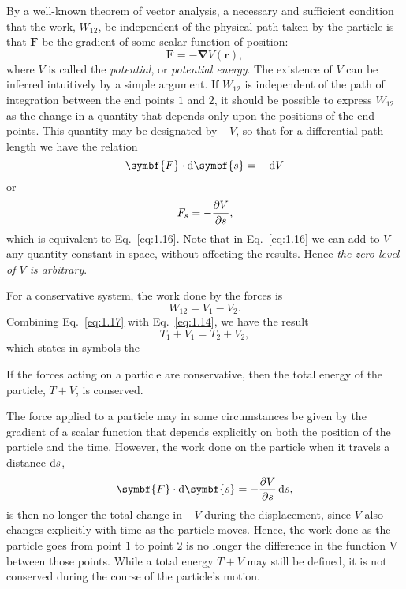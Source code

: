 By a well-known theorem of vector analysis, a necessary and sufficient condition that the work, \(W_{12}\), be independent of the physical path taken by the particle is that \(\symbf{F}\) be the gradient of some scalar function of position:
\begin{equation}
    \symbf{F}=-\symbf{\nabla} V\left(\symbf{r}\right),\label{eq:1.16}
\end{equation}
where \(V\) is called the \emph{potential}, or \emph{potential energy}. The existence of \(V\) can be inferred intuitively by a simple argument. If \(W_{12}\) is independent of the path of integration between the end points \(1\) and \(2\), it should be possible to express \(W_{12}\) as the change in a quantity that depends only upon the positions of the end points. This quantity may be designated by \(-V\), so that for a differential path length we have the relation
\begin{equation*}
    \symbf{F}\cdot\odif{\symbf{s}}=-\odif{V}
\end{equation*}
or
\begin{equation*}
    F_s=-\pdv{V}{s},
\end{equation*}
which is equivalent to Eq.~\eqref{eq:1.16}. Note that in Eq.~\eqref{eq:1.16} we can add to \(V\) any quantity constant in space, without affecting the results. Hence \emph{the zero level of \(V\) is arbitrary}.

For a conservative system, the work done by the forces is
\begin{equation}
    W_{12}=V_1-V_2.\label{eq:1.17}
\end{equation}
Combining Eq.~\eqref{eq:1.17} with Eq.~\eqref{eq:1.14}, we have the result
\begin{equation}
    T_1+V_1=T_2+V_2,\label{eq:1.18}
\end{equation}
which states in symbols the
\begin{theorem}
    If the forces acting on a particle are conservative, then the total energy of the particle, \(T+V\), is conserved.
\end{theorem}

The force applied to a particle may in some circumstances be given by the gradient of a scalar function that depends explicitly on both the position of the particle and the time. However, the work done on the particle when it travels a distance \(\odif{s}\),
\begin{equation*}
    \symbf{F}\cdot\odif{\symbf{s}}=-\pdv{V}{s}\odif{s},
\end{equation*}
is then no longer the total change in \(-V\) during the displacement, since \(V\) also changes explicitly with time as the particle moves. Hence, the work done as the particle goes from point \(1\) to point \(2\) is no longer the difference in the function V between those points. While a total energy \(T+V\) may still be defined, it is not conserved during the course of the particle's motion.
